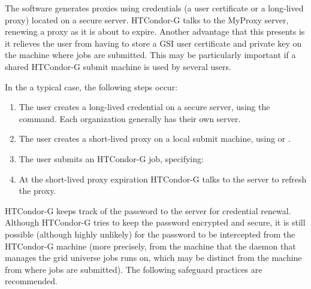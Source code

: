 The  software generates proxies using credentials
(a user certificate or a long-lived proxy) located on a secure
 server.
HTCondor-G talks to the MyProxy server,
renewing a proxy as it is about to expire.
Another advantage that this presents is it relieves the user
from having to store a GSI user certificate and private key
on the machine where jobs are submitted.
This may be particularly important if a shared HTCondor-G
submit machine is used by several users.

In the a typical case, the following steps occur:

\begin{enumerate}
\item{The user creates a long-lived credential}
on a secure  server, using the
 command.
Each organization generally has their own  server.

\item{The user creates a short-lived proxy}
on a local submit machine,
using
 or .

\item{The user submits}
an HTCondor-G job,
specifying:

\item{At the short-lived proxy expiration}
HTCondor-G talks to
the  server to refresh the proxy.

\end{enumerate}


HTCondor-G keeps track of the password to the  server
for credential renewal.
Although HTCondor-G tries to keep the password encrypted and secure,
it is still possible (although highly unlikely) for the password
to be intercepted from the HTCondor-G machine
(more precisely, from the machine that the
 daemon that manages the grid universe jobs runs on,
which may be distinct from the machine from where jobs are submitted).
The following safeguard practices are recommended.

